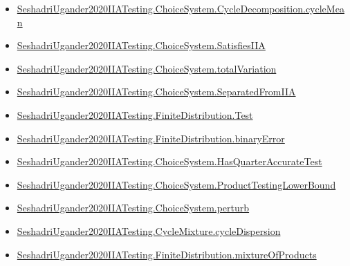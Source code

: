 \documentclass[10pt]{article}
\begin{document}
\begin{itemize}[leftmargin=1.2em]
\begin{itemize}[leftmargin=1.2em]
\item \hyperlink{paper-prerequisite-4f9c0f894e80708f}{Seshadri\allowbreak{}Ugander2020\allowbreak{}IIA\allowbreak{}Testing.\allowbreak{}Choice\allowbreak{}System.\allowbreak{}Cycle\allowbreak{}Decomposition.\allowbreak{}cycle\allowbreak{}Mean}
\item \hyperlink{paper-prerequisite-8641deb0e0512582}{Seshadri\allowbreak{}Ugander2020\allowbreak{}IIA\allowbreak{}Testing.\allowbreak{}Choice\allowbreak{}System.\allowbreak{}Satisfies\allowbreak{}IIA}
\item \hyperlink{paper-prerequisite-f9aa4f6576ac42f4}{Seshadri\allowbreak{}Ugander2020\allowbreak{}IIA\allowbreak{}Testing.\allowbreak{}Choice\allowbreak{}System.\allowbreak{}total\allowbreak{}Variation}
\item \hyperlink{paper-prerequisite-9511f5d19b7856b5}{Seshadri\allowbreak{}Ugander2020\allowbreak{}IIA\allowbreak{}Testing.\allowbreak{}Choice\allowbreak{}System.\allowbreak{}Separated\allowbreak{}From\allowbreak{}IIA}
\item \hyperlink{paper-prerequisite-1ae54af4030402fc}{Seshadri\allowbreak{}Ugander2020\allowbreak{}IIA\allowbreak{}Testing.\allowbreak{}Finite\allowbreak{}Distribution.\allowbreak{}Test}
\item \hyperlink{paper-prerequisite-0ee1ced5412e3e3f}{Seshadri\allowbreak{}Ugander2020\allowbreak{}IIA\allowbreak{}Testing.\allowbreak{}Finite\allowbreak{}Distribution.\allowbreak{}binary\allowbreak{}Error}
\item \hyperlink{paper-prerequisite-663ba384bf9fbba2}{Seshadri\allowbreak{}Ugander2020\allowbreak{}IIA\allowbreak{}Testing.\allowbreak{}Choice\allowbreak{}System.\allowbreak{}Has\allowbreak{}Quarter\allowbreak{}Accurate\allowbreak{}Test}
\item \hyperlink{paper-prerequisite-46210e1105d79432}{Seshadri\allowbreak{}Ugander2020\allowbreak{}IIA\allowbreak{}Testing.\allowbreak{}Choice\allowbreak{}System.\allowbreak{}Product\allowbreak{}Testing\allowbreak{}Lower\allowbreak{}Bound}
\item \hyperlink{paper-prerequisite-32d90e854afe59fd}{Seshadri\allowbreak{}Ugander2020\allowbreak{}IIA\allowbreak{}Testing.\allowbreak{}Choice\allowbreak{}System.\allowbreak{}perturb}
\item \hyperlink{paper-prerequisite-d1b6db8e571d96c2}{Seshadri\allowbreak{}Ugander2020\allowbreak{}IIA\allowbreak{}Testing.\allowbreak{}Cycle\allowbreak{}Mixture.\allowbreak{}cycle\allowbreak{}Dispersion}
\item \hyperlink{paper-prerequisite-4cbb8978d5ced12b}{Seshadri\allowbreak{}Ugander2020\allowbreak{}IIA\allowbreak{}Testing.\allowbreak{}Finite\allowbreak{}Distribution.\allowbreak{}mixture\allowbreak{}Of\allowbreak{}Products}

\end{itemize}
\end{itemize}
\end{document}
